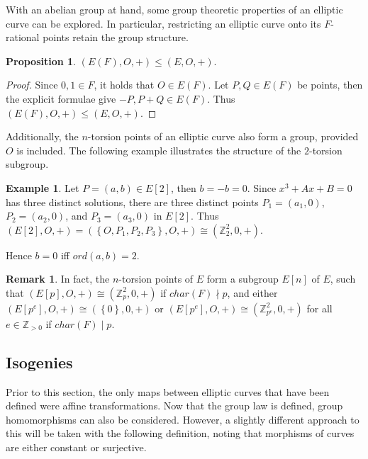 \documentclass{article}
\newcommand{\Z}{\mathbb{Z}}
\newcommand{\rb}[1]{\left( #1 \right)}
\renewcommand{\sb}[1]{\left[ #1 \right]}
\newcommand{\cb}[1]{\left\{ #1 \right\}}
\theoremstyle{definition}\newtheorem*{definition}{Definition}
\theoremstyle{definition}\newtheorem*{example}{Example}
\theoremstyle{definition}\newtheorem*{remark}{Remark}
\newtheorem{proposition}{Proposition}[subsection]
\begin{document}
With an abelian group at hand, some group theoretic properties of an elliptic curve can be explored. In particular, restricting an elliptic curve onto its $ F $-rational points retain the group structure.

\begin{proposition}
$ \rb{E\rb{F}, O, +} \le \rb{E, O, +} $.
\end{proposition}

\begin{proof}
Since $ 0, 1 \in F $, it holds that $ O \in E\rb{F} $. Let $ P, Q \in E\rb{F} $ be points, then the explicit formulae give $ -P, P + Q \in E\rb{F} $. Thus $ \rb{E\rb{F}, O, +} \le \rb{E, O, +} $.
\end{proof}

Additionally, the $ n $-torsion points of an elliptic curve also form a group, provided $ O $ is included. The following example illustrates the structure of the $ 2 $-torsion subgroup.

\begin{example}
Let $ P = \rb{a, b} \in E\sb{2} $, then $ b = -b = 0 $. Since $ x^3 + Ax + B = 0 $ has three distinct solutions, there are three distinct points $ P_1 = \rb{a_1, 0} $, $ P_2 = \rb{a_2, 0} $, and $ P_3 = \rb{a_3, 0} $ in $ E\sb{2} $. Thus $ \rb{E\sb{2}, O, +} = \rb{\cb{O, P_1, P_2, P_3}, O, +} \cong \rb{\Z_2^2, 0, +} $.
\end{example}

Hence $ b = 0 $ iff $ ord\rb{a, b} = 2 $.

\begin{remark}
In fact, the $ n $-torsion points of $ E $ form a subgroup $ E\sb{n} $ of $ E $, such that $ \rb{E\sb{p}, O, +} \cong \rb{\Z_p^2, 0, +} $ if $ char\rb{F} \nmid p $, and either $ \rb{E\sb{p^e}, O, +} \cong \rb{\cb{0}, 0, +} $ or $ \rb{E\sb{p^e}, O, +} \cong \rb{\Z_{p^e}^2, 0, +} $ for all $ e \in \Z_{> 0} $ if $ char\rb{F} \mid p $.
\end{remark}

\pagebreak

\subsection{Isogenies}

Prior to this section, the only maps between elliptic curves that have been defined were affine transformations. Now that the group law is defined, group homomorphisms can also be considered. However, a slightly different approach to this will be taken with the following definition, noting that morphisms of curves are either constant or surjective.
\end{document}
